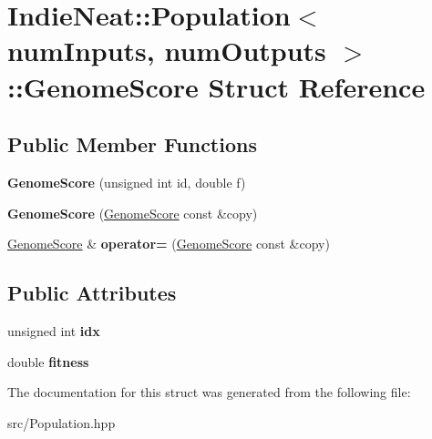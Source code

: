 \hypertarget{struct_indie_neat_1_1_population_1_1_genome_score}{}\section{Indie\+Neat\+:\+:Population$<$ num\+Inputs, num\+Outputs $>$\+:\+:Genome\+Score Struct Reference}
\label{struct_indie_neat_1_1_population_1_1_genome_score}
\subsection*{Public Member Functions}
\begin{DoxyCompactItemize}
\item 
\mbox{\label{struct_indie_neat_1_1_population_1_1_genome_score_a21fa32aada642143ca766d25da3d1243}} 
{\bfseries Genome\+Score} (unsigned int id, double f)
\item 
\mbox{\label{struct_indie_neat_1_1_population_1_1_genome_score_a069cd75c33671ba8dcb95339e81208c6}} 
{\bfseries Genome\+Score} (\hyperlink{struct_indie_neat_1_1_population_1_1_genome_score}{Genome\+Score} const \&copy)
\item 
\mbox{\label{struct_indie_neat_1_1_population_1_1_genome_score_ab505cea6c6acfd9f0631a8c8ecfdd2f5}} 
\hyperlink{struct_indie_neat_1_1_population_1_1_genome_score}{Genome\+Score} \& {\bfseries operator=} (\hyperlink{struct_indie_neat_1_1_population_1_1_genome_score}{Genome\+Score} const \&copy)
\end{DoxyCompactItemize}
\subsection*{Public Attributes}
\begin{DoxyCompactItemize}
\item 
\mbox{\label{struct_indie_neat_1_1_population_1_1_genome_score_ad270cdeb2ae09bf2c456d2b220731535}} 
unsigned int {\bfseries idx}
\item 
\mbox{\label{struct_indie_neat_1_1_population_1_1_genome_score_a060d718f8c10ad1f20d9cadbe7170d52}} 
double {\bfseries fitness}
\end{DoxyCompactItemize}


The documentation for this struct was generated from the following file\+:\begin{DoxyCompactItemize}
\item 
src/Population.\+hpp\end{DoxyCompactItemize}
